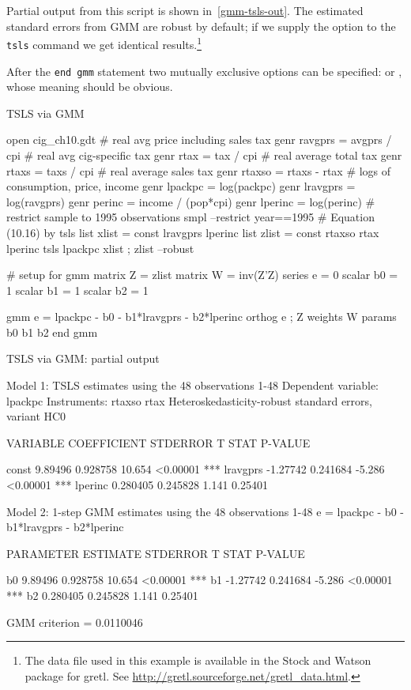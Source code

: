 Partial output from this script is shown in~\ref{gmm-tsls-out}.  The
estimated standard errors from GMM are robust by default; if we supply
the  option to the \texttt{tsls} command we get
identical results.\footnote{The data file used in this example is
  available in the Stock and Watson package for gretl.  See
  \url{http://gretl.sourceforge.net/gretl_data.html}.}

After the \texttt{end gmm} statement two mutually
exclusive options can be specified:  or
, whose meaning should be obvious.

\begin{script}[htbp]
  \caption{TSLS via GMM}
  \label{gmm-tsls-ex}
\begin{scode}
open cig_ch10.gdt
# real avg price including sales tax
genr ravgprs = avgprs / cpi
# real avg cig-specific tax
genr rtax = tax / cpi
# real average total tax
genr rtaxs = taxs / cpi
# real average sales tax
genr rtaxso = rtaxs - rtax
# logs of consumption, price, income
genr lpackpc = log(packpc)
genr lravgprs = log(ravgprs)
genr perinc = income / (pop*cpi)
genr lperinc = log(perinc)
# restrict sample to 1995 observations
smpl --restrict year==1995
# Equation (10.16) by tsls
list xlist = const lravgprs lperinc
list zlist = const rtaxso rtax lperinc
tsls lpackpc xlist ; zlist --robust

# setup for gmm
matrix Z = { zlist }
matrix W = inv(Z'Z)
series e = 0
scalar b0 = 1
scalar b1 = 1
scalar b2 = 1

gmm e = lpackpc - b0 - b1*lravgprs - b2*lperinc
  orthog e ; Z
  weights W
  params b0 b1 b2
end gmm 
\end{scode}
\end{script}

\begin{script}[htbp]
  \caption{TSLS via GMM: partial output}
  \label{gmm-tsls-out}
\begin{code}
Model 1: TSLS estimates using the 48 observations 1-48
Dependent variable: lpackpc
Instruments: rtaxso rtax 
Heteroskedasticity-robust standard errors, variant HC0

      VARIABLE       COEFFICIENT        STDERROR      T STAT   P-VALUE

  const                 9.89496          0.928758     10.654  <0.00001 ***
  lravgprs             -1.27742          0.241684     -5.286  <0.00001 ***
  lperinc               0.280405         0.245828      1.141   0.25401

Model 2: 1-step GMM estimates using the 48 observations 1-48
e = lpackpc - b0 - b1*lravgprs - b2*lperinc

      PARAMETER       ESTIMATE          STDERROR      T STAT   P-VALUE

  b0                    9.89496          0.928758     10.654  <0.00001 ***
  b1                   -1.27742          0.241684     -5.286  <0.00001 ***
  b2                    0.280405         0.245828      1.141   0.25401

  GMM criterion = 0.0110046
\end{code}
\end{script}


